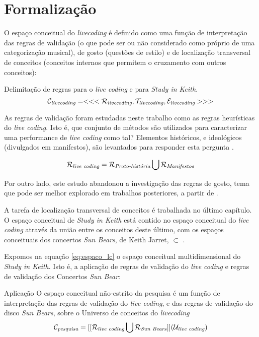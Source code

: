 \section{Formalização}

O espaço conceitual do \emph{livecoding} é definido como uma função de interpretação das regras de validação (o que pode ser ou não considerado como próprio de uma categorização musical), de gosto (questões de estilo) e de localização transversal de conceitos (conceitos internos que permitem o cruzamento com outros conceitos):

\begin{example}{Delimitação de regras para o \emph{live coding} e para \emph{Study in Keith}.}
\begin{equation}
\mathcal{C}_\emph{livecoding} = <<<\mathcal{R}_\emph{livecoding}, \mathcal{T}_\emph{livecoding},  \mathcal{E}_\emph{livecoding} >>> 
\end{equation}

As regras de validação foram estudadas neste trabalho como as regras heurísticas do \emph{live coding}. Isto é, que conjunto de métodos são utilizados para caracterizar uma performance de \emph{live coding} como tal? Elementos históricos, e ideológicos (divulgados em manifestos), são levantados para responder esta pergunta .

\begin{equation}
\mathcal{R}_\emph{live coding} = \mathcal{R}_\emph{Proto-história} \bigcup  \mathcal{R}_\emph{Manifestos}
\end{equation}

Por outro lado, este estudo abandonou a investigação das regras de gosto, tema que pode ser melhor explorado em trabalhos posteriores, a partir de .

A tarefa de localização transversal de conceitos é trabalhada no último capítulo. O espaço conceitual de \emph{Study in Keith} está contido no espaço conceitual do \emph{live coding} através da união entre os conceitos deste último, com os espaços conceituais dos concertos \emph{Sun Bears}, de Keith Jarret,  $\subset$ . 

\end{example}

Expomos na equação \ref{eq:espaco_lc} o espaço conceitual multidimensional do \emph{Study in Keith}. Isto é, a aplicação de regras de validação do \emph{live coding} e regras de validação dos Concertos \emph{Sun Bear}:

\begin{example}{Aplicação}\label{eq:espaco_lc}
O espaço conceitual não-estrito da pesquisa é um função de interpretação das regras de validação do \emph{live coding}, e das regras de validação do disco \emph{Sun Bears}, sobre o Universo de conceitos do \emph{livecoding}
\begin{equation}
\mathcal{C}_\emph{pesquisa} = [[\mathcal{R}_\emph{live coding} \bigcup \mathcal{R}_\emph{Sun Bears}]](\mathcal{U}_\emph{live coding} )
\end{equation}
\end{example}